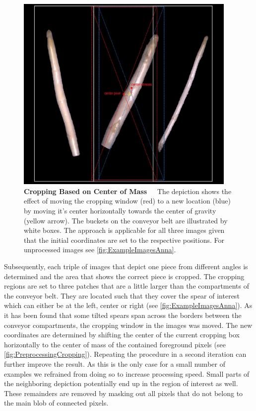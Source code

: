 \begin{figure}[!ht]
	\centering
	\includegraphics[width=0.95\textwidth]{Figures/chapter03/preprocessing_cropping.png}
	\decoRule
	\caption[Cropping Based on Center of Mass]{\textbf{Cropping Based on Center of Mass}~~~The depiction shows the effect of moving the cropping window (red) to a new location (blue) by moving it's center horizontally towards the center of gravity (yellow arrow). The buckets on the conveyor belt are illustrated by white boxes. The approach is applicable for all three images given that the initial coordinates are set to the respective positions. For unprocessed images see \autoref{fig:ExampleImagesAnna}.}
	\label{fig:PreprocessingCropping}
\end{figure}

\bigskip
Subsequently, each triple of images that depict one piece from different angles is determined and the area that shows the correct piece is cropped. The cropping regions are set to three patches that are a little larger than the compartments of the conveyor belt. They are located such that they cover the spear of interest which can either be at the left, center or right (see \autoref{fig:ExampleImagesAnna}). As it has been found that some tilted spears span across the borders between the conveyor compartments, the cropping window in the images was moved. The new coordinates are determined by shifting the center of the current cropping box horizontally to the center of mass of the contained foreground pixels (see \autoref{fig:PreprocessingCropping}). Repeating the procedure in a second iteration can further improve the result. As this is the only case for a small number of examples we refrained from doing so to increase processing speed. Small parts of the neighboring depiction potentially end up in the region of interest as well. These remainders are removed by masking out all pixels that do not belong to the main blob of connected pixels.

